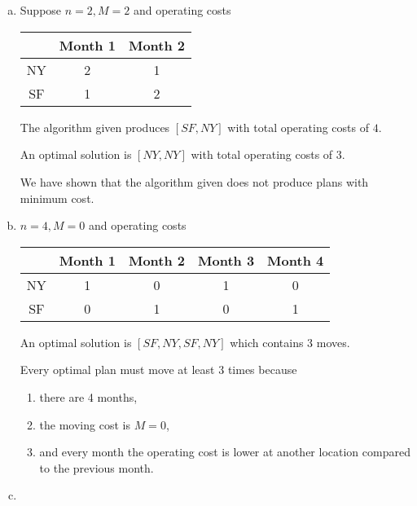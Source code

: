 \documentclass[12pt, a4paper]{article}
\begin{document}
\section{} %
\begin{enumerate}[(a)]
	\item %
	Suppose $n = 2, M = 2$ and operating costs\\
	\begin{tabular}{|c||c|c|}
		\hline
		& Month 1 & Month 2\\
		\hline
		NY & 2 & 1\\
		\hline
		SF & 1 & 2\\
		\hline
	\end{tabular}

	The algorithm given produces $[SF, NY]$ with total operating costs of $4$.

	An optimal solution is $[NY, NY]$ with total operating costs of $3$.

	We have shown that the algorithm given does not produce plans with minimum cost.

	\item %
	$n = 4, M = 0$ and operating costs\\
	\begin{tabular}{|c||c|c|c|c|}
		\hline
		& Month 1 & Month 2 & Month 3 & Month 4\\
		\hline
		NY & 1 & 0 & 1 & 0\\
		\hline
		SF & 0 & 1 & 0 & 1\\
		\hline
	\end{tabular}

	An optimal solution is $[SF, NY, SF, NY]$ which contains 3 moves.

	Every optimal plan must move at least 3 times because
	\begin{enumerate}
		\item there are 4 months,
		\item the moving cost is $M = 0$,
		\item and every month the operating cost is lower at another location compared to the previous month.
	\end{enumerate}

	\item %
\end{enumerate}
\end{document}
